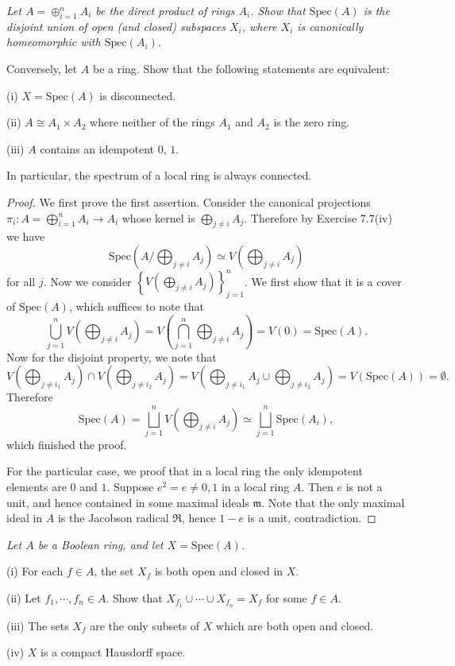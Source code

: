 \begin{problem}\em
Let $A=\oplus_{i=1}^nA_i$ be the direct product of rings $A_i$. Show that $\mathrm{Spec}(A)$ is the disjoint union of open (and closed) subspaces $X_i$, where $X_i$ is canonically homeomorphic with $\mathrm{Spec}(A_i)$.\par
Conversely, let $A$ be a ring. Show that the following statements are equivalent:\par
(i) $X=\mathrm{Spec}(A)$ is disconnected.\par
(ii) $A\cong A_1\times A_2$ where neither of the rings $A_1$ and $A_2$ is the zero ring.\par
(iii) $A$ contains an idempotent $0$, $1$.\par
In particular, the spectrum of a local ring is always connected.
\end{problem}
\begin{proof}
We first prove the first assertion. Consider the canonical projections $\pi _i:A=\bigoplus_{i=1}^n{A_i}\rightarrow A_i$ whose kernel is $\bigoplus_{j\ne i}A_j$. Therefore by Exercise 7.7(iv) we have 
$$
\mathrm{Spec}\left( A/\bigoplus_{j\ne i}{A_j} \right) \simeq V\left( \bigoplus_{j\ne i}{A_j} \right) 
$$
for all $j$. Now we consider $\left\{V\left(\bigoplus_{j\ne i}A_j\right)\right\}_{j=1}^n$. We first show that it is a cover of $\mathrm{Spec}(A)$, which suffices to note that 
$$
\bigcup_{j=1}^n{V\left( \bigoplus_{j\ne i}{A_j} \right)}=V\left( \bigcap_{j=1}^n{\bigoplus_{j\ne i}{A_j}} \right) =V\left( 0 \right) =\mathrm{Spec}\left( A \right) .
$$
Now for the disjoint property, we note that 
$$
V\left( \bigoplus_{j\ne i_1}{A_j} \right) \cap V\left( \bigoplus_{j\ne i_2}{A_j} \right) =V\left( \bigoplus_{j\ne i_1}{A_j}\cup \bigoplus_{j\ne i_2}{A_j} \right) =V\left( \mathrm{Spec}\left( A \right) \right) =\emptyset .
$$
Therefore 
$$
\mathrm{Spec}\left( A \right) =\bigsqcup_{j=1}^n{V\left( \bigoplus_{j\ne i}{A_j} \right)}\simeq \bigsqcup_{j=1}^n{\mathrm{Spec}\left( A_i \right)},
$$
which finished the proof.\par
For the particular case, we proof that in a local ring the only idempotent elements are $0$ and $1$. Suppose $e^2=e\ne 0,1$ in a local ring $A$. Then $e$ is not a unit, and hence contained in some maximal ideals $\mathfrak{m}$. Note that the only maximal ideal in $A$ is the Jacobson radical $\mathfrak{R}$, hence $1-e$ is a unit, contradiction.
\end{proof}
\begin{problem}\em
Let $A$ be a Boolean ring, and let $X=\mathrm{Spec}(A)$.\par
(i) For each $f\in A$, the set $X_f$ is both open and closed in $X$.\par
(ii) Let $f_1,\cdots,f_n\in A$. Show that $X_{f_1}\cup\cdots\cup X_{f_n}=X_f$ for some $f\in A$.\par
(iii) The sets $X_f$ are the only subsets of $X$ which are both open and closed.\par
(iv) $X$ is a compact Hausdorff space.
\end{problem}
